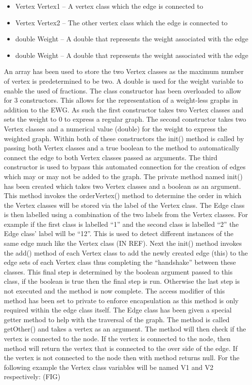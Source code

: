 \documentclass{AISB2008}
\begin{document}
{\begin{itemize}
\item Vertex Vertex1 – A vertex class which the edge is connected to
\item Vertex Vertex2 – The other vertex class which the edge is connected to
\item double Weight – A double that represents the weight associated with the edge
\item double Weight – A double that represents the weight associated with the edge
\end{itemize}

An array has been used to store the two Vertex classes as the maximum number of vertex is predetermined to be two. A double is used for the weight variable to enable the used of fractions. 
The class constructor has been overloaded to allow for 3 constructors. This allows for the representation of a weight-less graphs in addition to the EWG. As such the first constructor takes two Vertex classes and sets the weight to 0 to express a regular graph. The second constructor takes two Vertex classes and a numerical value (double) for the weight to express the weighted graph. Within both of these constructors the init()  method is called by passing both Vertex classes and a true boolean to the method to automatically connect the edge to both Vertex classes passed as arguments. The third constructor is used to bypass this automated connection for the creation of edges which may or may not be added to the graph.
The private method named init() has been created which takes two Vertex classes and a boolean as an argument. This method invokes the orderVertex() method to determine the order in which the Vertex classes will be stored via the label of the Vertex class. The Edge class is then labelled using a combination of the two labels from the Vertex classes. For example if the first class is labelled “1” and the second class is labelled “2” the Edge class’ label will be “12”. This is used to detect different instances of the same edge much like the Vertex class (IN REF). Next the init() method invokes the add() method of each Vertex class to add the newly created edge (this) to the edge sets of each Vertex class thus completing the “handshake” between these classes. This final step is determined by the boolean argument passed to this class, if the boolean is true then the final step is run. Otherwise the last step is not executed and the method is now complete. The access modifier of this method has been set to private to enforce encapsulation as this method is only required within the edge class itself.
The Edge class has been given a special getter method to help with the traversal of the graph. The method is called getOther() and takes a vertex as an argument. The method will then check if the vertex is connected to the node. If the vertex is connected to the node, then method will return the vertex that is connected to the over side of the edge. If the vertex is not connected to the node then with method returns null.
For the following example the Vertex class variables will be named V1 and V2 respectively:
(FIG)

}
\end{document}
